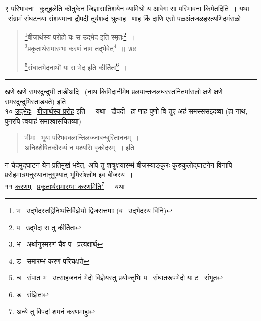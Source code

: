 \documentclass[11pt, openany]{book}
\begin{document}
९ परिभावना \textendash\ कुतूहलेति कौतुकेन जिज्ञासातिशयेन व्यामिश्रो य आवेगः सा परिभावना किमेतदिति~। यथा \textendash\ संग्रामं संघटनया संशयमाना द्रौपदी तूर्यशब्दं श्रुत्वाह \textendash\ {\qt णाह किं दाणि एसो पळअंतजळहरत्थणिदमंसळो}

\newpage

\begin{quote}
{\na \renewcommand{\thefootnote}{1}\footnote{भ \textendash\ उद्भेदस्तद्विनिष्पत्तिर्विज्ञेयो द्विजसत्तमाः (ब \textendash\ उद्भेदस्य विनि)}बीजार्थस्य प्ररोहो यः स उद्भेद इति स्मृतः\renewcommand{\thefootnote}{2}\footnote{प \textendash\ उद्भेदः स तु कीर्तितः}~।\\
\renewcommand{\thefootnote}{3}\footnote{भ \textendash\ अर्थानुस्मरणं चैव प \textendash\ प्रत्यक्षार्थ}प्रकृतार्थसमारम्भः करणं नाम तद्भेवेत्\renewcommand{\thefootnote}{4}\footnote{ड \textendash\ समारम्भं करणं परिचक्षते}~॥~७४

\renewcommand{\thefootnote}{5}\footnote{च \textendash\ संपात भ \textendash\ उत्साहजननं भेदो विज्ञेयस्तु प्रयोक्तृभिः प \textendash\ संघातरूपभेदो यः ट \textendash\ संभूत}संघातभेदनार्थो यः स भेद इति कीर्तितः\renewcommand{\thefootnote}{6}\footnote{ड \textendash\ संज्ञितः}~।}
\end{quote}

\hrule

\vspace{2mm}
\noindent
खणे खणे समरदुन्दुभी ताडीअदि \textendash\ (नाथ किमिदानीमेष प्रलयान्तजलधरस्तनितमांसलो क्षणे क्षणे समरदुन्दुभिस्ताड्यते) इति\\

१० \underline{उद्भेदः} \textendash\ \underline{बीजार्थस्य प्ररोह} इति~। यथा \textendash\ द्रौपदी \textendash\ हा णाह पुणो वि तुए अहं समस्ससइदव्वा (हा नाथ, पुनरपि त्वयाहं समाश्वासयितव्या)\\

\begin{quote}
भीमः \textendash\ {\qt भूयः परिभवक्लान्तिलज्जाबन्धुरिताननम्~।\\
अनिश्शेषितकौरव्यं न पश्यसि वृकोदरम्~॥} इति~।
\end{quote}

\noindent
न चेदमुद्घाटनं येन प्रतिमुखं भवेत्, अपि तु शत्रुक्षयारम्भं बीजस्याङ्कुरः कुरुकुलोद्घाटनेन विनापि प्ररोहमात्रमनुस्थानानुगुण्यात् भूमिसंश्लोष इव बीजस्य~।\\

११ \underline{करणम्} \textendash\ \underline{प्रकृतार्थसमारम्भः करणमिति}\renewcommand{\thefootnote}{*}\footnote{अन्ये तु विपदां शमनं करणमाहुः}~। यथा \textendash \\
\end{document}
